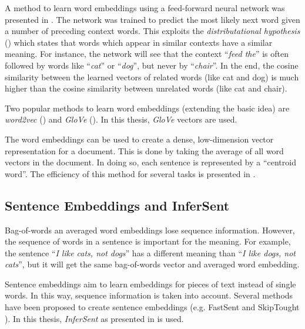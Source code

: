 A method to learn word embeddings using a feed-forward neural network was presented in \cite{bengio2003neural}. The network was trained to predict the most likely next word given a number of preceding context words. This exploits the \emph{distributational hypothesis} (\cite{harris1954distributional}) which states that words which appear in similar contexts have a similar meaning. For instance, the network will see that the context \enquote{\emph{feed the}} is often followed by words like \enquote{\emph{cat}} or \enquote{\emph{dog}}, but never by \enquote{\emph{chair}}. In the end, the cosine similarity between the learned vectors of related words (like cat and dog) is much higher than the cosine similarity between unrelated words (like cat and chair).

Two popular methods to learn word embeddings (extending the basic idea) are \emph{word2vec} (\cite{NIPS2013_5021}) and \emph{GloVe} (\cite{pennington2014glove}). In this thesis, \emph{GloVe} vectors are used.

The word embeddings can be used to create a dense, low-dimension vector representation for a document. This is done by taking the average of all word vectors in the document. In doing so, each sentence is represented by a \enquote{centroid word}. The efficiency of this method for several tasks is presented in \cite{Wieting:2015aa}.

\subsection{Sentence Embeddings and InferSent}
Bag-of-words an averaged word embeddings lose sequence information. However, the sequence of words in a sentence is important for the meaning. For example, the sentence \enquote{\emph{I like cats, not dogs}} has a different meaning than \enquote{\emph{I like dogs, not cats}}, but it will get the same bag-of-words vector and averaged word embedding.

Sentence embeddings aim to learn embeddings for pieces of text instead of single words. In this way, sequence information is taken into account. Several methods have been proposed to create sentence embeddings (e.g. FastSent \cite{hill2016learning} and SkipTought \cite{NIPS2015_5950}). In this thesis, \emph{InferSent} as presented in \cite{Conneau:2017aa} is used.


